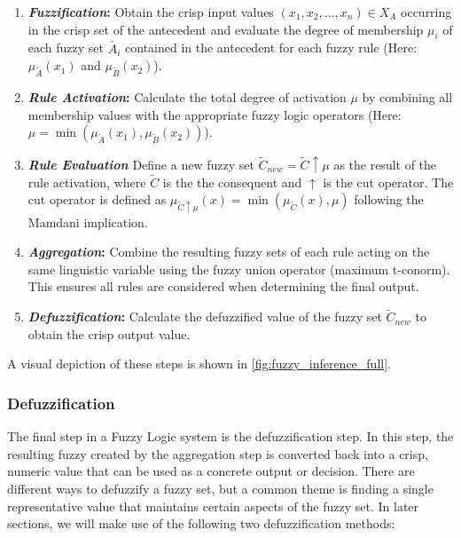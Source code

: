 \begin{enumerate}
      \item \textbf{\emph{Fuzzification}:} Obtain the crisp input values $(x_1, x_2, \ldots, x_n) \in X_{A}$ occurring in the crisp set of the antecedent and evaluate the degree of membership $\mu_i$ of each fuzzy set $\tilde{A_i}$ contained in the antecedent for each fuzzy rule (Here: $\mu_{\tilde{A}}(x_1)$ and $\mu_{\tilde{B}}(x_2)$).
      \item \textbf{\emph{Rule Activation}:} Calculate the total degree of activation $\mu$ by combining all membership values with the appropriate fuzzy logic operators (Here: $\mu = \min(\mu_{\tilde{A}}(x_1), \mu_{\tilde{B}}(x_2))$).
      \item \textbf{\emph{Rule Evaluation}} Define a new fuzzy set $\tilde{C}_{new}=\tilde{C}\uparrow \mu$ as the result of the rule activation, where $\tilde{C}$ is the the consequent and $\uparrow$ is the cut operator. The cut operator is defined as $\mu_{\tilde{C}\uparrow \mu}(x) = \min(\mu_{\tilde{C}}(x), \mu)$ following the Mamdani implication.
      \item \textbf{\emph{Aggregation}:}  Combine the resulting fuzzy sets of each rule acting on the same linguistic variable using the fuzzy union operator (maximum t-conorm). This ensures all rules are considered when determining the final output.
      \item \textbf{\emph{Defuzzification}:} Calculate the defuzzified value of the fuzzy set $\tilde{C}_{new}$ to obtain the crisp output value.
\end{enumerate}

A visual depiction of these steps is shown in \autoref{fig:fuzzy_inference_full}.

\subsubsection{Defuzzification}

The final step in a Fuzzy Logic system is the defuzzification step. In this step, the resulting fuzzy created by the aggregation step is converted back into a crisp, numeric value that can be used as a concrete output or decision. There are different ways to defuzzify a fuzzy set, but a common theme is finding a single representative value that maintains certain aspects of the fuzzy set. In later sections, we will make use of the following two defuzzification methods:

